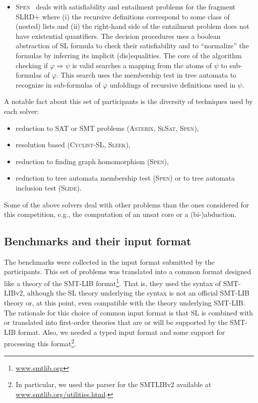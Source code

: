 \documentclass[twoside,11pt]{article}
\newcommand{\limp}{\Rightarrow}
\newcommand{\ASTERIX}{\textsc{Asterix}}
\newcommand{\CYCLIST}{\textsc{Cyclist-SL}}
\newcommand{\SLEEK}{\textsc{Sleek}}
\newcommand{\SLIDE}{\textsc{Slide}}
\newcommand{\SLSAT}{\textsc{SlSat}}
\newcommand{\SPEN}{\textsc{Spen}}
\begin{document}
\begin{itemize}
\item \SPEN~\cite{EneaLSV14,SPENsite} 
deals with satisfiability and entailment problems for the fragment SLRD+ where 
(i) the recursive definitions correspond to some class of (nested) lists
and (ii) the right-hand side of the entailment problem does not have existential quantifiers.
The decision procedures uses a boolean abstraction of SL formula to check their satisfiability and to ``normalize'' the formulas by inferring its implicit (dis)equalities. %
The core of the algorithm checking if $\varphi\limp\psi$ is valid searches a mapping from the atoms of $\psi$ to sub-formulas of $\varphi$.
This search uses the membership test in tree automata to recognize in sub-formulas of $\varphi$ unfoldings of recursive definitions used in $\psi$.

\end{itemize}

A notable fact about this set of participants is the diversity of techniques used by each solver:
\begin{itemize}
\item reduction to SAT or SMT problems (\ASTERIX, \SLSAT, \SPEN),
\item resolution based (\CYCLIST, \SLEEK),
\item reduction to finding graph homomorphism (\SPEN),
\item reduction to tree automata membership test (\SPEN) or to tree automata inclusion test (\SLIDE).
\end{itemize}

Some of the above solvers deal with other problems than the ones considered for this competition, e.g., the computation of an unsat core or a (bi-)abduction.


\subsection{Benchmarks and their input format}
The benchmarks were collected in the input format submitted by the participants.
This set of problems was translated into a common format designed like a theory of the SMT-LIB format\footnote{\url{www.smtlib.org}}. That is, they used the syntax of SMT-LIBv2, although the SL theory underlying the syntax is not an official SMT-LIB theory or, at this point, even compatible with the theory underlying SMT-LIB.
The rationale for this choice of common input format is 
that SL is combined with or translated into first-order theories that are or will be supported by the SMT-LIB format.
Also, we needed a typed input format and some support for processing this format\footnote{In particular, we used the parser for the SMTLIBv2 available at \url{www.smtlib.org/utilities.html}.}.
 
\end{document}
